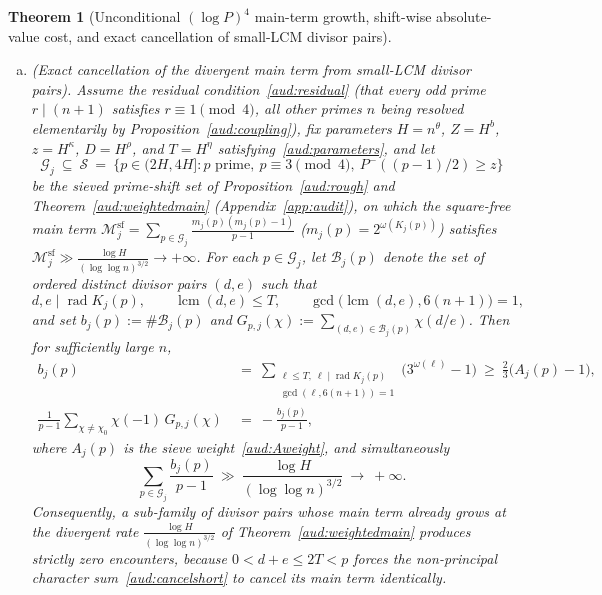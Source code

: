 \documentclass[11pt, a4paper]{article}
\theoremstyle{plain}
\newtheorem{theorem}{Theorem}[section]
\theoremstyle{definition}
\newcommand{\sfm}{\mathrm{sf}}
\DeclareMathOperator{\rad}{rad}
\DeclareMathOperator{\lcm}{lcm}
\begin{document}
\begin{theorem}[Unconditional $(\log P)^{4}$ main-term growth, shift-wise absolute-value cost, and exact cancellation of small-LCM divisor pairs]
\begin{enumerate}[(a)]
    \item \emph{(Exact cancellation of the divergent main term from small-LCM divisor pairs).} Assume the residual condition~\eqref{aud:residual} (that every odd prime $r\mid(n+1)$ satisfies $r\equiv1\pmod 4$, all other primes $n$ being resolved elementarily by Proposition~\ref{aud:coupling}), fix parameters $H=n^{\theta}$, $Z=H^{b}$, $z=H^{\kappa}$, $D=H^{\rho}$, and $T=H^{\eta}$ satisfying~\eqref{aud:parameters}, and let
    \[
    \mathcal{G}_j\ \subseteq\ \mathcal{S}\ =\ \big\{p\in(2H,4H]:p\text{ prime},\ p\equiv3\pmod 4,\ P^{-}((p-1)/2)\ge z\big\}
    \]
    be the sieved prime-shift set of Proposition~\ref{aud:rough} and Theorem~\ref{aud:weightedmain} (Appendix~\ref{app:audit}), on which the square-free main term $\mathcal{M}_j^{\sfm}=\sum_{p\in\mathcal{G}_j}\frac{m_j(p)(m_j(p)-1)}{p-1}$ ($m_j(p)=2^{\omega(K_j(p))}$) satisfies $\mathcal{M}_j^{\sfm}\gg\frac{\log H}{(\log\log n)^{3/2}}\to+\infty$. For each $p\in\mathcal{G}_j$, let $\mathcal{B}_j(p)$ denote the set of \emph{ordered distinct} divisor pairs $(d,e)$ such that
    \[
    d,e\mid\rad K_j(p),\qquad \lcm(d,e)\le T,\qquad \gcd\!\big(\lcm(d,e),6(n+1)\big)=1,
    \]
    and set $b_j(p):=\#\mathcal{B}_j(p)$ and $G_{p,j}(\chi):=\sum_{(d,e)\in\mathcal{B}_j(p)}\chi(d/e)$. Then for sufficiently large $n$,
    \begin{align}
    b_j(p)\ &=\ \sum_{\substack{\ell\le T,\ \ell\mid\rad K_j(p)\\ \gcd(\ell,6(n+1))=1}}\big(3^{\omega(\ell)}-1\big)\ \ge\ \frac{2}{3}\big(A_j(p)-1\big),\label{aud:bshort}\\
    \frac{1}{p-1}\sum_{\chi\ne\chi_0}\chi(-1)\,G_{p,j}(\chi)\ &=\ -\frac{b_j(p)}{p-1},\label{aud:cancelshort}
    \end{align}
    where $A_j(p)$ is the sieve weight~\eqref{aud:Aweight}, and simultaneously
    \begin{equation}\label{aud:shortmass}
    \sum_{p\in\mathcal{G}_j}\frac{b_j(p)}{p-1}\ \gg\ \frac{\log H}{(\log\log n)^{3/2}}\ \longrightarrow\ +\infty.
    \end{equation}
    Consequently, a sub-family of divisor pairs whose main term already grows at the divergent rate $\frac{\log H}{(\log\log n)^{3/2}}$ of Theorem~\ref{aud:weightedmain} produces \emph{strictly zero encounters}, because $0<d+e\le 2T<p$ forces the non-principal character sum~\eqref{aud:cancelshort} to cancel its main term identically.
\end{enumerate}
\end{theorem}
\end{document}
